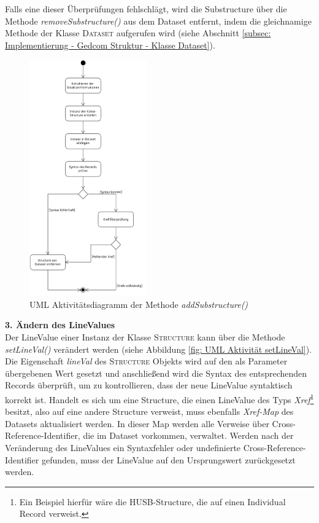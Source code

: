 Falls eine dieser Überprüfungen fehlschlägt, wird die Substructure über die Methode \textit{removeSubstructure()} aus dem Dataset entfernt, indem die gleichnamige Methode der Klasse \textsc{Dataset} aufgerufen wird (siehe Abschnitt \ref{subsec: Implementierung - Gedcom Struktur - Klasse Dataset}).
\begin{figure}[h]
	\centering
	\includegraphics[width=0.45\textwidth]{images/UML_Activity_AddSubstruct.png}
	\caption{UML Aktivitätsdiagramm der Methode \textit{addSubstructure()}}
	\label{fig: UML Aktivität addSubstructure}
\end{figure}

\textbf{3. Ändern des LineValues} \vspace{0.5em} \\
Der LineValue einer Instanz der Klasse \textsc{Structure} kann über die Methode \textit{setLineVal()} verändert werden (siehe Abbildung \ref{fig: UML Aktivität setLineVal}). Die Eigenschaft \textit{lineVal} des \textsc{Structure} Objekts wird auf den als Parameter übergebenen Wert gesetzt und anschließend wird die Syntax des entsprechenden Records überprüft, um zu kontrollieren, dass der neue LineValue syntaktisch korrekt ist.
Handelt es sich um eine Structure, die einen LineValue des Typs \textit{Xref}\footnote{Ein Beispiel hierfür wäre die HUSB-Structure, die auf einen Individual Record verweist.} besitzt, also auf eine andere Structure verweist, muss ebenfalls \textit{Xref-Map} des Datasets aktualisiert werden. In dieser Map werden alle Verweise über Cross-Reference-Identifier, die im Dataset vorkommen, verwaltet. Werden nach der Veränderung des LineValues ein Syntaxfehler oder undefinierte Cross-Reference-Identifier gefunden, muss der LineValue auf den Ursprungswert zurückgesetzt werden. 

